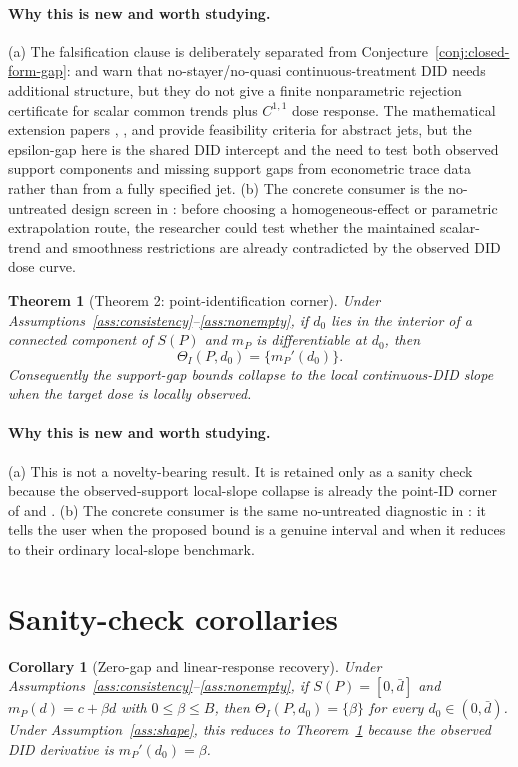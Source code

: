 \documentclass[11pt]{article}
\theoremstyle{definition}
\theoremstyle{plain}
\newtheorem{theorem}{Theorem}
\newtheorem{corollary}{Corollary}
\theoremstyle{remark}
\begin{document}
\paragraph{Why this is new and worth studying.}
(a) The falsification clause is deliberately separated from Conjecture~\ref{conj:closed-form-gap}: \citet{DCDHK2026NoUntreated} and \citet{DCDHVB2024NoStayers} warn that no-stayer/no-quasi continuous-treatment DID needs additional structure, but they do not give a finite nonparametric rejection certificate for scalar common trends plus \(C^{1,1}\) dose response.  The mathematical extension papers \citet{Wells1973}, \citet{LeGruyer2009}, and \citet{DaniilidisHaddouLeGruyerLey2018} provide feasibility criteria for abstract jets, but the epsilon-gap here is the shared DID intercept and the need to test both observed support components and missing support gaps from econometric trace data rather than from a fully specified jet.  (b) The concrete consumer is the no-untreated design screen in \citet{DCDHK2026NoUntreated}: before choosing a homogeneous-effect or parametric extrapolation route, the researcher could test whether the maintained scalar-trend and smoothness restrictions are already contradicted by the observed DID dose curve.

\begin{theorem}[Theorem 2: point-identification corner]\label{thm:point-id-corner}
Under Assumptions~\ref{ass:consistency}--\ref{ass:nonempty}, if \(d_0\) lies in the interior of a connected component of \(S(P)\) and \(m_P\) is differentiable at \(d_0\), then
\[
  \Theta_I(P,d_0)=\{m_P'(d_0)\}.
\]
Consequently the support-gap bounds collapse to the local continuous-DID slope when the target dose is locally observed.
\end{theorem}
\paragraph{Why this is new and worth studying.}
(a) This is not a novelty-bearing result.  It is retained only as a sanity check because the observed-support local-slope collapse is already the point-ID corner of \citet{DCDHPSVB2025ContinuousEveryPeriod} and \citet{DCDHK2026NoUntreated}.  (b) The concrete consumer is the same no-untreated diagnostic in \citet{DCDHK2026NoUntreated}: it tells the user when the proposed bound is a genuine interval and when it reduces to their ordinary local-slope benchmark.

\section{Sanity-check corollaries}
\begin{corollary}[Zero-gap and linear-response recovery]\label{cor:zero-gap-linear}
Under Assumptions~\ref{ass:consistency}--\ref{ass:nonempty}, if \(S(P)=[0,\bar d]\) and \(m_P(d)=c+\beta d\) with \(0\le\beta\le B\), then \(\Theta_I(P,d_0)=\{\beta\}\) for every \(d_0\in(0,\bar d)\).  Under Assumption~\ref{ass:shape}, this reduces to Theorem~\ref{thm:point-id-corner} because the observed DID derivative is \(m_P'(d_0)=\beta\).
\end{corollary}
\end{document}
